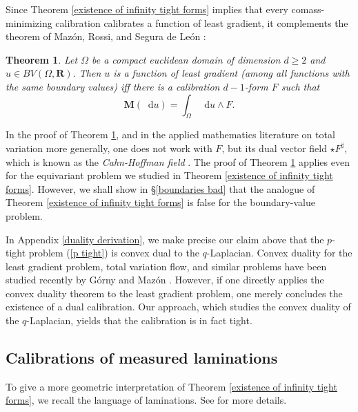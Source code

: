 \documentclass[reqno,11pt]{amsart}
\newcommand{\RR}{\mathbf{R}}
\newcommand*\dif{\mathop{}\!\mathrm{d}}
\newcommand{\Mass}{\mathbf M}
\newcommand{\dfn}[1]{\emph{#1}\index{#1}}
\newtheorem{theorem}{Theorem}[section]
\theoremstyle{definition}
\numberwithin{equation}{section}
\begin{document}
Since Theorem \ref{existence of infinity tight forms} implies that every comass-minimizing calibration calibrates a function of least gradient, it complements the theorem of Maz\'on, Rossi, and Segura de Le\'on \cite{Mazon14}:

\begin{theorem}\label{Mazon MFMC}
Let $\Omega$ be a compact euclidean domain of dimension $d \geq 2$ and $u \in BV(\Omega, \RR)$.
Then $u$ is a function of least gradient (among all functions with the same boundary values) iff there is a calibration $d - 1$-form $F$ such that 
$$\Mass(\dif u) = \int_\Omega \dif u \wedge F.$$
\end{theorem}

In the proof of Theorem \ref{Mazon MFMC}, and in the applied mathematics literature on total variation more generally, one does not work with $F$, but its dual vector field $\star F^\sharp$, which is known as the \dfn{Cahn-Hoffman field} \cite{giga2024topics}.
The proof of Theorem \ref{Mazon MFMC} applies even for the equivariant problem we studied in Theorem \ref{existence of infinity tight forms}.
However, we shall show in \S\ref{boundaries bad} that the analogue of Theorem \ref{existence of infinity tight forms} is false for the boundary-value problem.

In Appendix \ref{duality derivation}, we make precise our claim above that the $p$-tight problem (\ref{p tight}) is convex dual to the $q$-Laplacian.
Convex duality for the least gradient problem, total variation flow, and similar problems have been studied recently by G\'orny and Maz\'on \cite{górny2022dualitybased}.
However, if one directly applies the convex duality theorem to the least gradient problem, one merely concludes the existence of a dual calibration.
Our approach, which studies the convex duality of the $q$-Laplacian, yields that the calibration is in fact tight.

\subsection{Calibrations of measured laminations}\label{lamination intro sec}
To give a more geometric interpretation of Theorem \ref{existence of infinity tight forms}, we recall the language of laminations.
See \cite{BackusCML} for more details.
\end{document}

